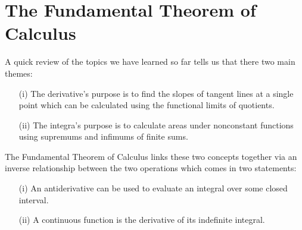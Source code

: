 \section{The Fundamental Theorem of Calculus}

A quick review of the topics we have learned so far tells us that there two main themes:
\begin{enumerate}
    \item[(i)] The derivative's purpose is to find the slopes of tangent lines at a single point which can be calculated using the functional limits of quotients.
	\item[(ii)] The integra's purpose is to calculate areas under nonconstant functions using supremums and infimums of finite sums.
\end{enumerate}

The Fundamental Theorem of Calculus links these two concepts together via an inverse relationship between the two operations which comes in two statements:
\begin{enumerate}
    \item[(i)] An antiderivative can be used to evaluate an integral over some closed interval.
	\item[(ii)] A continuous function is the derivative of its indefinite integral.
\end{enumerate}


